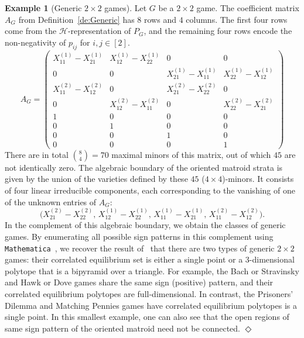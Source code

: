 \documentclass[11pt]{amsart}
\theoremstyle{definition}
\newtheorem{example}[theorem]{Example}
\numberwithin{subcase}{case}
\newcommand*{\QEDA}{\hfill\ensuremath{\Diamond}}
\begin{document}
\begin{example}[Generic $2\times2$ games]
Let $G$ be a $2\times 2$ game. The coefficient matrix $A_G$ from Definition~\ref{de:Generic} has $8$ rows and $4$ columns. The first four rows come from the $\mathcal{H}$-representation of $P_G$, and the remaining four rows encode the non-negativity of $p_{ij}$ for $i,j \in [2]$.
\[
A_G=\begin{pmatrix}
X^{(1)}_{11} - X^{(1)}_{21} & X^{(1)}_{12} - X^{(1)}_{22} & 0 & 0 \\
0 & 0 & X^{(1)}_{21} - X^{(1)}_{11} & X^{(1)}_{22} - X^{(1)}_{12} \\
X^{(2)}_{11} - X^{(2)}_{12} & 0 & X^{(2)}_{21} - X^{(2)}_{22} & 0 \\
0 & X^{(2)}_{12} - X^{(2)}_{11} & 0 & X^{(2)}_{22} - X^{(2)}_{21} \\
1 & 0 & 0 & 0 \\
0 & 1 & 0 & 0 \\
0 & 0 & 1 & 0 \\
0 & 0 & 0 & 1
\end{pmatrix}
\]
There are in total $\binom{8}{4}=70$ maximal minors of this matrix, out of which $45$ are not identically zero. The algebraic boundary of the oriented matroid strata is given by the union of the varieties defined by these $45$ ($4 \times 4$)-minors. It consists of four linear irreducible components, each corresponding to the vanishing of one of the unknown entries of $A_G$:
\[
\bigl(
X^{(2)}_{21} - X^{(2)}_{22},\,
X^{(1)}_{12} - X^{(1)}_{22},\,
X^{(1)}_{11} - X^{(1)}_{21},\,
X^{(2)}_{11} - X^{(2)}_{12}
\bigr).
\]
In the complement of this algebraic boundary, we obtain the classes of generic games. By enumerating all possible sign patterns in this complement using \texttt{Mathematica}~\cite{combinatorics-correlated-equilibria}, we recover the result of~\cite{calvo2003set} that there are two types of generic $2 \times 2$ games: their correlated equilibrium set is either a single point or a $3$-dimensional polytope that is a bipyramid over a triangle. For example, the Bach or Stravinsky and Hawk or Dove games share the same sign (positive) pattern, and their correlated equilibrium polytopes are full-dimensional. In contrast, the Prisoners' Dilemma and Matching Pennies games have correlated equilibrium polytopes is a single point. In this smallest example, one can also see that the open regions of same sign pattern of the oriented matroid need not be connected. \QEDA
\end{example}
\end{document}
